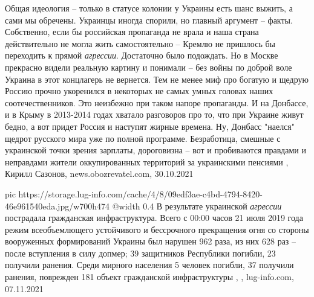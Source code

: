 Общая идеология – только в статусе колонии у Украины есть шанс выжить, а сами
мы обречены. Украинцы иногда спорили, но главный аргумент – факты. Собственно,
если бы российская пропаганда не врала и наша страна действительно не могла
жить самостоятельно – Кремлю не пришлось бы переходить к прямой \emph{агрессии}.
Достаточно было подождать. Но в Москве прекрасно видели реальную картину и
понимали – без войны по доброй воле Украина в этот концлагерь не вернется.
Тем не менее миф про богатую и щедрую Россию прочно укоренился в некоторых не
самых умных головах наших соотечественников. Это неизбежно при таком напоре
пропаганды. И на Донбассе, и в Крыму в 2013-2014 годах хватало разговоров про
то, что при Украине живут бедно, а вот придет Россия и наступят жирные времена.
Ну, Донбасс "наелся" щедрот русского мира уже по полной программе. Безработица,
смешные с украинской точки зрения зарплаты, дороговизна – вот и пробиваются
правдами и неправдами жители оккупированных территорий за украинскими пенсиями
, 
Кирилл Сазонов, news.obozrevatel.com, 30.10.2021

\ifcmt
  pic https://storage.lug-info.com/cache/4/8/09edf3ae-c4bd-4794-8420-46e961540eda.jpg/w700h474%
  @width 0.4
\fi
В результате украинской \emph{агрессии} пострадала гражданская инфраструктура.
Всего с 00:00 часов 21 июля 2019 года режим всеобъемлющего устойчивого и
бессрочного прекращения огня со стороны вооруженных формирований Украины был
нарушен 962 раза, из них 628 раз – после вступления в силу допмер; 39
защитников Республики погибли, 23 получили ранения. Среди мирного населения 5
человек погибли, 37 получили ранения, поврежден 181 объект гражданской
инфраструктуры
, 
, lug-info.com, 07.11.2021
